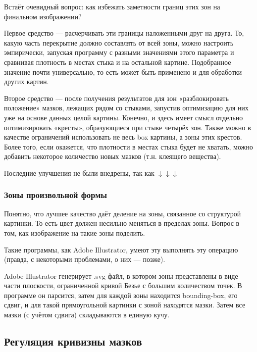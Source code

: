 Встаёт очевидный вопрос: как избежать заметности границ этих зон на финальном изображении?

Первое средство — расчерчивать эти границы наложенными друг на друга.
То, какую часть перекрытие должно составлять от всей зоны, можно настроить эмпирически, запуская программу с разными значениями этого параметра
и сравнивая плотность в местах стыка и на остальной картине.
Подобранное значение почти универсально, то есть может быть применено и для обработки других картин.

Второе средство — после получения результатов для зон «разблокировать положение» мазков, лежащих рядом со стыками,
запустив оптимизацию для них уже на основе данных целой картины.
Конечно, и здесь имеет смысл отдельно оптимизировать «кресты», образующиеся при стыке четырёх зон.
Также можно в качестве ограничений использовать не весь box картины, а зоны этих крестов.
Более того, если окажется, что плотности в местах стыка будет не хватать, можно добавить некоторое количество новых мазков (т.н. клеящего вещества).

Последние улучшения не были внедрены, так как $\downarrow\downarrow\downarrow$ %

\subsubsection{Зоны произвольной формы}
Понятно, что лучшее качество даёт деление на зоны, связанное со структурой картинки.
То есть цвет должен несильно меняться в пределах зоны.
Вопрос в том, как изображение на такие зоны поделить.

Такие программы, как Adobe Illustrator, умеют эту выполнять эту операцию (правда, с некоторыми проблемами, о них — позже).

Adobe Illustrator генерирует .svg файл, в котором зоны представлены в виде части плоскости,
ограниченной кривой Безье с большим количеством точек.
В программе он парсится, затем для каждой зоны находится bounding-box, его сдвиг,
и для такой прямоугольной картинки с зоной находятся мазки.
Затем все мазки (с учётом сдвига) складываются в единую кучу.




\subsection{Регуляция кривизны мазков}\label{subsec:curvature-regulation}

